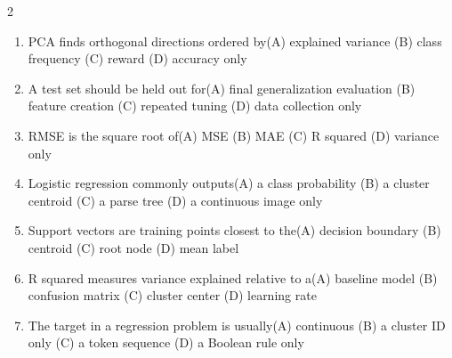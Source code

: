 \documentclass[a4paper]{article}
\begin{document}
\begin{multicols*}{2}
\fontsize{8.5}{10}\selectfont
\begin{enumerate}[resume]
\item PCA finds orthogonal directions ordered by\newline\hspace*{0.6em}(A) explained variance \quad (B) class frequency \newline\hspace*{0.6em}(C) reward \quad (D) accuracy only
\item A test set should be held out for\newline\hspace*{0.6em}(A) final generalization evaluation \quad (B) feature creation \newline\hspace*{0.6em}(C) repeated tuning \quad (D) data collection only
\item RMSE is the square root of\newline\hspace*{0.6em}(A) MSE \quad (B) MAE \newline\hspace*{0.6em}(C) R squared \quad (D) variance only
\item Logistic regression commonly outputs\newline\hspace*{0.6em}(A) a class probability \quad (B) a cluster centroid \newline\hspace*{0.6em}(C) a parse tree \quad (D) a continuous image only
\item Support vectors are training points closest to the\newline\hspace*{0.6em}(A) decision boundary \quad (B) centroid \newline\hspace*{0.6em}(C) root node \quad (D) mean label
\item R squared measures variance explained relative to a\newline\hspace*{0.6em}(A) baseline model \quad (B) confusion matrix \newline\hspace*{0.6em}(C) cluster center \quad (D) learning rate
\item The target in a regression problem is usually\newline\hspace*{0.6em}(A) continuous \quad (B) a cluster ID only \newline\hspace*{0.6em}(C) a token sequence \quad (D) a Boolean rule only

\end{enumerate}
\end{multicols*}
\end{document}
